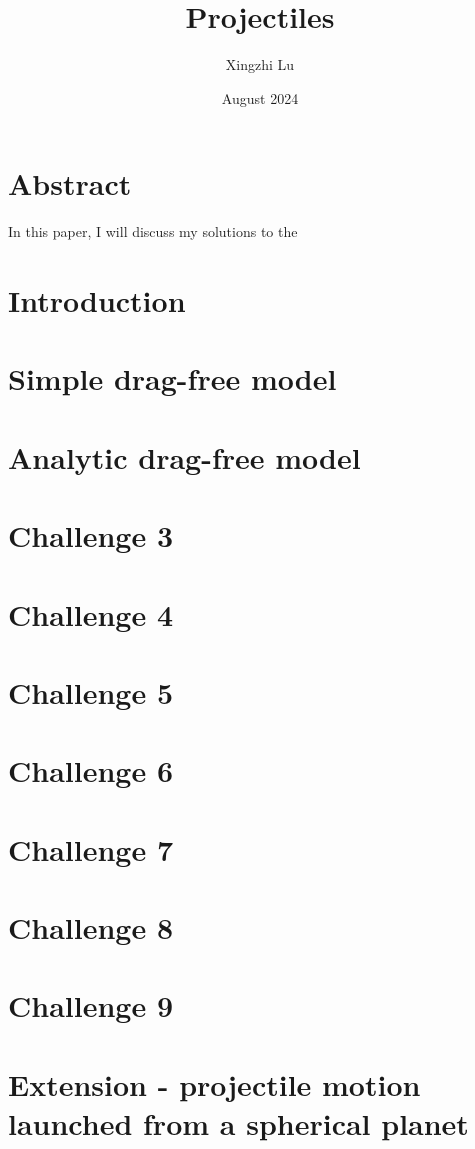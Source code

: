 \documentclass[12pt,a4paper]{article}
\title{Projectiles}
\author{Xingzhi Lu}
\date{August 2024}
\begin{document}
    \maketitle
    \begin{multicols}{1}
        \section*{Abstract}
        In this paper, I will discuss my solutions to the 
        
        \section*{Introduction}


        \section{Simple drag-free model}
        \blindtext


        \section{Analytic drag-free model}
        \blindtext
        


        \section{Challenge 3}
        \blindtext


        \section{Challenge 4}
        \blindtext[10]


        \section{Challenge 5}


        \section{Challenge 6}


        \section{Challenge 7}


        \section{Challenge 8}


        \section{Challenge 9}
        
        
        \section{Extension - projectile motion launched from a spherical planet}

    \end{multicols}
\end{document}

